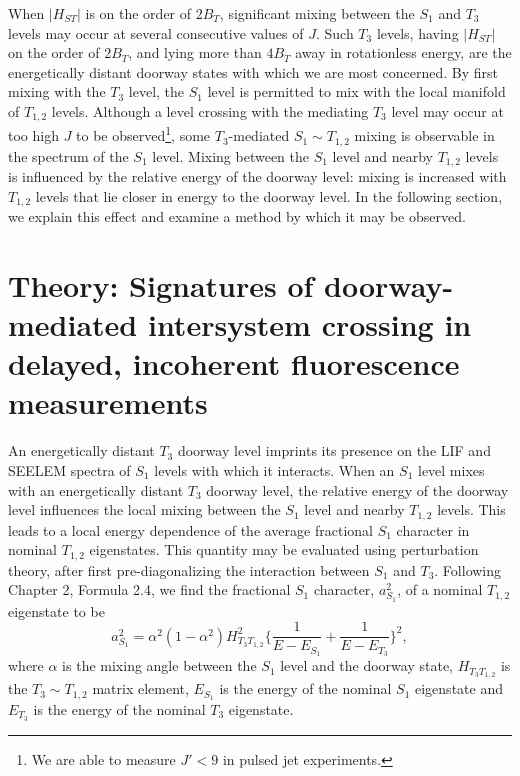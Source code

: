 When $\lvert H_{ST} \rvert$ is on the order of $2B_T$, significant
mixing between the $S_1$ and $T_3$ levels may occur at several
consecutive values of $J$.  Such $T_3$ levels, having $\lvert H_{ST}
\rvert$ on the order of $2B_T$, and lying more than $4B_T$ away in
rotationless energy, are the energetically distant doorway states with
which we are most concerned.  By first mixing with the $T_3$ level,
the $S_1$ level is permitted to mix with the local manifold of
$T_{1,2}$ levels.  Although a level crossing with the mediating $T_3$
level may occur at too high $J$ to be observed\footnote{We are able to
  measure $J' < 9$ in pulsed jet experiments.}, some $T_3$-mediated
$S_1 \sim T_{1,2}$ mixing is observable in the spectrum of the $S_1$
level.  Mixing between the $S_1$ level and nearby $T_{1,2}$ levels is
influenced by the relative energy of the doorway level: mixing is
increased with $T_{1,2}$ levels that lie closer in energy to the
doorway level.  In the following section, we explain this effect and
examine a method by which it may be observed.



























\section{Theory: Signatures of doorway-mediated intersystem crossing
  in delayed, incoherent fluorescence measurements}

An energetically distant $T_3$ doorway level imprints its presence on
the LIF and SEELEM spectra of $S_1$ levels with which it interacts.
When an $S_1$ level mixes with an energetically distant $T_3$ doorway
level, the relative energy of the doorway level influences the local
mixing between the $S_1$ level and nearby $T_{1,2}$ levels.  This
leads to a local energy dependence of the average fractional $S_1$
character in nominal $T_{1,2}$ eigenstates.  This quantity may be
evaluated using perturbation theory, after first pre-diagonalizing the
interaction between $S_1$ and $T_3$.  Following Chapter 2, Formula
2.4, we find the fractional $S_1$ character, $a_{S_1}^2$, of a nominal
$T_{1,2}$ eigenstate to be
\begin{equation}
  \label{eq:ave-s1-char}
    a_{S_1}^2 = 
    \alpha^2 (1-\alpha^2) H_{T_3T_{1,2}}^2
    \biggl \lbrace 
    \frac{1}{E - E_{S_1}} 
    + \frac{1}{E - E_{T_3}} 
    \biggr \rbrace^2,
\end{equation}
where $\alpha$ is the mixing angle between the $S_1$ level and the
doorway state, $H_{T_3T_{1,2}}$ is the $T_3 \sim T_{1,2}$ matrix
element, $E_{S_1}$ is the energy of the nominal $S_1$ eigenstate and
$E_{T_3}$ is the energy of the nominal $T_3$ eigenstate.

